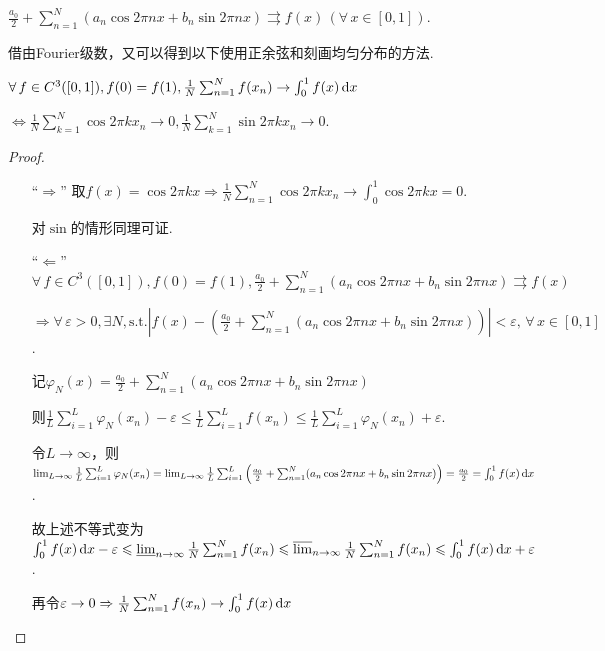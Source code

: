 \begin{theorem*}
    $\frac{a_0}{2}+\sum_{n=1}^N(a_n\cos{2\pi nx}+b_n\sin{2\pi nx})\rightrightarrows f(x) \, (\forall\, x\in[0,1])$.
\end{theorem*}

借由Fourier级数，又可以得到以下使用正余弦和刻画均匀分布的方法.

\begin{theorem}
    $\forall\, f \in C^3([0,1]), f(0)=f(1),\frac{1}{N}\sum_{n=1}^N{f(x_n)}\to \int_{0}^{1}{f(x)}\mathop{}\!\mathrm{d} x$\par
    $\Leftrightarrow \frac{1}{N}\sum_{k=1}^N{\cos{2\pi kx_n}}\to 0,\frac{1}{N}\sum_{k=1}^N{\sin{2\pi kx_n}}\to 0$.\par
\end{theorem}
\begin{proof}
    \begin{itemize}
        \item[“$\Rightarrow$”] 取$f(x)=\cos{2\pi kx} \Rightarrow \frac{1}{N}\sum_{n=1}^N{\cos{2\pi kx_n}} \to \int_0^1{\cos{2\pi kx}} = 0$.\par
        对$\sin$的情形同理可证.
        \item[“$\Leftarrow$”] $\forall\, f \in C^3([0,1]),f(0)=f(1),\frac{a_0}{2}+\sum_{n=1}^N(a_n\cos{2\pi nx}+b_n\sin{2\pi nx})\rightrightarrows f(x)$\par
        $\Rightarrow \forall\, \varepsilon>0,\exists N,\text{s.t.}\left\lvert f(x) - \left(\frac{a_0}{2}+\sum_{n=1}^N(a_n\cos{2\pi nx}+b_n\sin{2\pi nx})\right)\right\rvert < \varepsilon,\,\forall\, x\in [0,1]$.\par
        记$\varphi_N(x) = \frac{a_0}{2}+\sum_{n=1}^N(a_n\cos{2\pi nx}+b_n\sin{2\pi nx})$\par
        则$\frac{1}{L}\sum_{i=1}^L{\varphi_N(x_n)} - \varepsilon \leq \frac{1}{L}\sum_{i=1}^L{f(x_n)} \leq \frac{1}{L}\sum_{i=1}^L{\varphi_N(x_n)} + \varepsilon$.\par
        令$L\to\infty$，则$\lim_{L\to\infty}\frac{1}{L}\sum_{i=1}^L{\varphi_N(x_n)}=\lim_{L\to\infty}{\frac{1}{L}\sum_{i=1}^L{\left(\frac{a_0}{2}+\sum_{n=1}^N(a_n\cos{2\pi nx}+b_n\sin{2\pi nx})\right)}}=\frac{a_0}{2}=\int_0^1{f(x)}\mathop{}\!\mathrm{d} x$.\par
        故上述不等式变为$\int_0^1{f(x)}\mathop{}\!\mathrm{d} x-\varepsilon \leqslant \varliminf_{n\to\infty}{\frac{1}{N}\sum_{n=1}^N{f(x_n)}} \leqslant \varlimsup_{n\to\infty}{\frac{1}{N}\sum_{n=1}^N{f(x_n)}} \leqslant \int_0^1{f(x)}\mathop{}\!\mathrm{d} x+\varepsilon$.\par
        再令$\varepsilon\to 0 \Rightarrow \frac{1}{N}\sum_{n=1}^N{f(x_n)}\to \int_{0}^{1}{f(x)}\mathop{}\!\mathrm{d} x$
    \end{itemize}
\end{proof}\par\noindent

